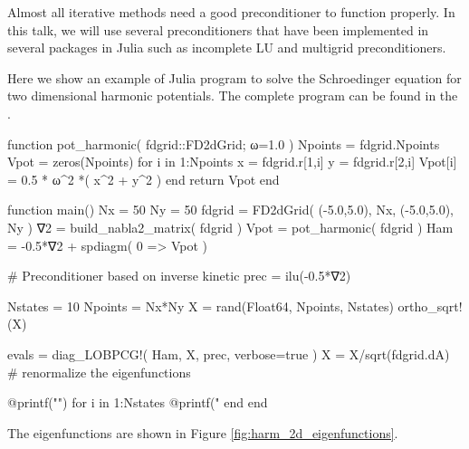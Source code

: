 Almost all iterative methods need a good preconditioner to function properly. In this
talk, we will use several preconditioners that have been implemented in several packages
in Julia such as incomplete LU and multigrid preconditioners.

Here we show an example of Julia program to solve the Schroedinger equation for two
dimensional harmonic potentials. The complete program can be found in the
.

\begin{juliacode}
function pot_harmonic( fdgrid::FD2dGrid; ω=1.0 )
  Npoints = fdgrid.Npoints
  Vpot = zeros(Npoints)
  for i in 1:Npoints
    x = fdgrid.r[1,i]
    y = fdgrid.r[2,i]
    Vpot[i] = 0.5 * ω^2 *( x^2 + y^2 )
  end
  return Vpot
end

function main()
  Nx = 50
  Ny = 50
  fdgrid = FD2dGrid( (-5.0,5.0), Nx, (-5.0,5.0), Ny )
  ∇2 = build_nabla2_matrix( fdgrid )
  Vpot = pot_harmonic( fdgrid )
  Ham = -0.5*∇2 + spdiagm( 0 => Vpot )

  # Preconditioner based on inverse kinetic
  prec = ilu(-0.5*∇2)

  Nstates = 10
  Npoints = Nx*Ny
  X = rand(Float64, Npoints, Nstates)
  ortho_sqrt!(X)
    
  evals = diag_LOBPCG!( Ham, X, prec, verbose=true )
  X = X/sqrt(fdgrid.dA) # renormalize the eigenfunctions

  @printf("\n\nEigenvalues\n")
  for i in 1:Nstates
    @printf("%
  end
end
\end{juliacode}


The eigenfunctions are shown in Figure \ref{fig:harm_2d_eigenfunctions}.

